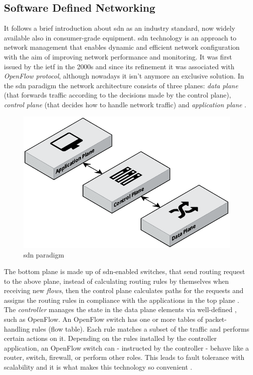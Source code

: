 
\subsection{Software Defined Networking}
\label{subsec:sdn}

It follows a brief introduction about \gls{sdn} as an industry standard, now widely available also in consumer-grade equipment. \gls{sdn} technology is an approach to network management that enables dynamic and efficient network configuration with the aim of improving network performance and monitoring. It was first issued by the \gls{ietf} in the 2000s and since its refinement it was associated with \textit{OpenFlow protocol}, although nowadays it isn't anymore an exclusive solution. In the \gls{sdn} paradigm the network architecture consists of three planes: \textit{data plane} (that forwards traffic according to the decisions made by the control plane), \textit{control plane} (that decides how to handle network traffic) and \textit{application plane} \cite{Kreutz2015}.

\begin{figure}[h!]
    \centering
    \includegraphics[scale=0.33]{assets/figures/chapter2/SDN Paradigm.png}
    \caption{\gls{sdn} paradigm}
    \label{fig:sdn-paradigm}
\end{figure}
\noindent The bottom plane is made up of \gls{sdn}-enabled switches, that send routing request to the above plane, instead of calculating routing rules by themselves when receiving new \textit{flows}, then the control plane calculates paths for the requests and assigns the routing rules in compliance with the applications in the top plane \cite{Xu2017}. The \textit{controller} manages the state in the data plane elements via well-defined , such as OpenFlow. An OpenFlow switch has one or more tables of packet-handling rules (flow table). Each rule matches a subset of the traffic and performs certain actions on it. Depending on the rules installed by the controller application, an OpenFlow switch can - instructed by the controller - behave like a router, switch, firewall, or perform other roles. This leads to fault tolerance with scalability and it is what makes this technology so convenient \cite{Lantz2015}.

